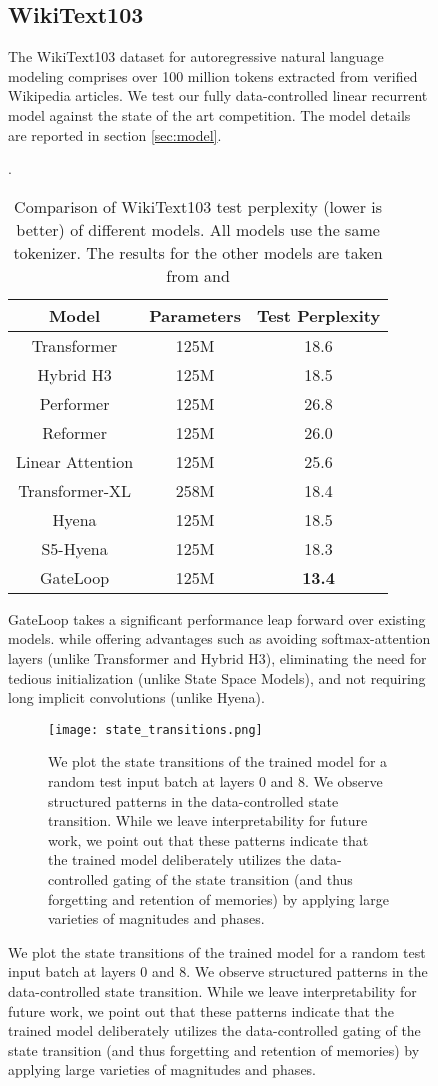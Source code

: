 \documentclass{article} \usepackage{iclr2024_conference,times}
\begin{document}
\begin{figure}[H]
\begin{minipage}{0.6\textwidth}
\subsection{WikiText103}\label{subsec:WikiText103}

The WikiText103 dataset for autoregressive natural language modeling comprises over 100 million tokens extracted from verified Wikipedia articles. We test our fully data-controlled linear recurrent model against the state of the art competition. The model details are reported in section \ref{sec:model}. 

\begin{table}[H]
    \caption{Comparison of WikiText103 test perplexity (lower is better) of different models. All models use the same tokenizer. The results for the other models are taken from \cite{poli2023hyena} and \cite{smith2023github}}.
    \centering
    \begin{tabular}{ccc}
        \toprule
        Model & Parameters & Test Perplexity \\ 
        \midrule
        Transformer & 125M & 18.6 \\ 
        Hybrid H3 & 125M & 18.5 \\ 
        Performer & 125M & 26.8 \\ 
        Reformer & 125M & 26.0 \\ 
        Linear Attention & 125M & 25.6 \\ 
        Transformer-XL & 258M & 18.4 \\ 
        Hyena & 125M & 18.5 \\
        S5-Hyena & 125M & 18.3 \\
        GateLoop & 125M & \textbf{13.4} \\
        \bottomrule
    \end{tabular}
    \label{table:2}
\end{table}

GateLoop takes a significant performance leap forward over existing models.  while offering advantages such as avoiding softmax-attention layers (unlike Transformer and Hybrid H3), eliminating the need for tedious initialization (unlike State Space Models), and not requiring long implicit convolutions (unlike Hyena). 

\begin{figure}[H]
    \begin{center}
        \texttt{[image: state\_transitions.png]}
    \end{center}
    \caption{We plot the state transitions of the trained model for a random test input batch at layers 0 and 8. We observe structured patterns in the data-controlled state transition. While we leave interpretability for future work, we point out that these patterns indicate that the trained model deliberately utilizes the data-controlled gating of the state transition (and thus forgetting and retention of memories) by applying large varieties of magnitudes and phases.}
\end{figure}


\end{minipage}
\end{figure}
\end{document}
